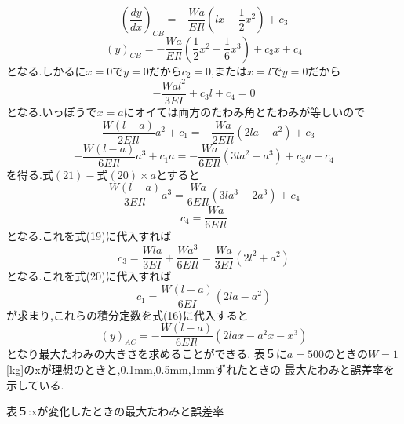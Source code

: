 \documentclass[a4paper,11pt]{jsarticle}
\begin{document}
\begin{enumerate}
\begin{equation}
          {(\dfrac{dy}{dx})_{CB}}={-\dfrac{Wa}{EIl}(lx-\dfrac{1}{2}x^2)+c_3}
        \end{equation}
        \begin{equation}
          {(y)_{CB}}={-\dfrac{Wa}{EIl}(\dfrac{1}{2}x^2-\dfrac{1}{6}x^3)+c_3x+c_4}
        \end{equation}
        となる.しかるに$x=0$で$y=0$だから$c_2=0$,または$x=l$で$y=0$だから
        \begin{equation}
          {-\dfrac{Wal^2}{3EI}+c_3l+c_4}=0
        \end{equation}
        となる.いっぽうで$x=a$にオイては両方のたわみ角とたわみが等しいので
        \begin{equation}
          {-\dfrac{W(l-a)}{2EIl}a^2+c_1}={-\dfrac{Wa}{2EIl}(2la-a^2)+c_3}
        \end{equation}
        \begin{equation}
          {-\dfrac{W(l-a)}{6EIl}a^3+c_1a}={-\dfrac{Wa}{6EIl}(3la^2-a^3)+c_3a+c_4}
        \end{equation}
        を得る.$式(21)-式(20) \times a$とすると
        \begin{equation}
          {\dfrac{W(l-a)}{3EIl}a^3}={\dfrac{Wa}{6EIl}(3la^3-2a^3)+c_4}
        \end{equation}
        \begin{equation}
          c_4={\dfrac{Wa}{6EIl}}
        \end{equation}
        となる.これを式(19)に代入すれば
        \begin{equation}
          c_3={\dfrac{Wla}{3EI}+\dfrac{Wa^3}{6EIl}}={\dfrac{Wa}{3EI}(2l^2+a^2)}
        \end{equation}
        となる.これを式(20)に代入すれば
        \begin{equation}
          c_1={\dfrac{W(l-a)}{6EI}(2la-a^2)}
        \end{equation}
        が求まり,これらの積分定数を式(16)に代入すると
        \begin{equation}
          {(y)_{AC}}={-\dfrac{W(l-a)}{6EIl}(2lax-a^2x-x^3)}
        \end{equation}
        となり最大たわみの大きさを求めることができる.
        表５に$a=500$のときの$W=1$[kg]のxが理想のときと,0.1mm,0.5mm,1mmずれたときの
        最大たわみと誤差率を示している.\\
        \begin{table}[h]
          \centering
          \caption*{表５:xが変化したときの最大たわみと誤差率}
          \label{tab:表５}
          \large

\end{table}
\end{enumerate}
\end{document}
